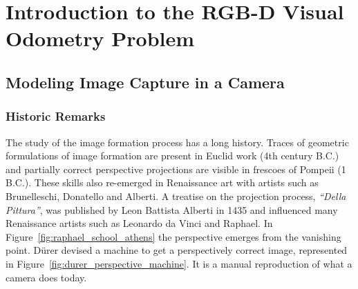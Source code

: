 \chapter{Introduction to the RGB-D Visual Odometry Problem}%
\label{cha:rgbd_vo}

\minitoc%
\clearpage

\section{Modeling Image Capture in a Camera}%
\label{sec:image-formation}

\subsection{Historic Remarks}%
\label{sub:historic_remarks}

The study of the image formation process has a long history.
Traces of geometric formulations of image formation are present
in Euclid work (4th century B.C.) and partially correct perspective
projections are visible in frescoes of Pompeii (1 B.C.).
These skills also re-emerged in Renaissance art with artists such as
Brunelleschi, Donatello and Alberti.
A treatise on the projection process, \textit{``Della Pittura''},
was published by Leon Battista Alberti in 1435 and influenced
many Renaissance artists such as Leonardo da Vinci and Raphael.
In Figure~\ref{fig:raphael_school_athens}
the perspective emerges from the vanishing point.
D\"urer devised a machine to get a perspectively correct image,
represented in Figure~\ref{fig:durer_perspective_machine}.
It is a manual reproduction of what a camera does today.

